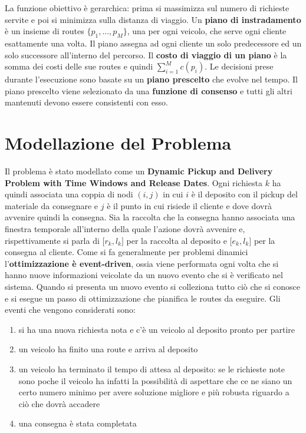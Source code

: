 \documentclass[
    article,            %
    12pt,                %
    oneside,            %
    a4paper,            %
    english,            %
    italian,                %
    sumario=tradicional,
]{abntex2}
\begin{document}
\newline
La funzione obiettivo è gerarchica: prima si massimizza sul numero di richieste servite e poi si minimizza sulla distanza di viaggio.
\newline
Un \textbf{piano di instradamento} è un insieme di routes $\{p_1,...,p_M\}$, una per ogni veicolo, che serve ogni cliente esattamente una volta. Il piano assegna ad ogni cliente un solo predecessore ed un solo successore all'interno del percorso.  Il \textbf{costo di viaggio di un piano} è la somma dei costi delle sue routes e quindi $\sum_{i=1}^M c(p_i)$. Le decisioni prese durante l'esecuzione sono basate su un \textbf{piano prescelto} che evolve nel tempo. Il piano prescelto viene selezionato da una \textbf{funzione di consenso} e tutti gli altri mantenuti devono essere consistenti con esso.

\hypertarget{modellazione-del-problema}{%
\section{Modellazione del Problema}\label{modellazione-del-problema}}

Il problema è stato modellato come un \textbf{Dynamic Pickup and Delivery Problem with Time Windows and Release Dates}. Ogni richiesta {\(k\)} ha quindi associata una coppia di nodi {\((i,j)\)} in cui {\(i\)} è il deposito con il pickup del materiale da consegnare e {\(j\)} è il punto in cui risiede il cliente e dove dovrà avvenire quindi la consegna. Sia la raccolta che la consegna hanno associata una finestra temporale all'interno della quale l'azione dovrà avvenire e, rispettivamente si parla di {\(\lbrack r_{k},l_{k}\rbrack\)} per la raccolta al deposito e {\(\lbrack e_{k},l_{k}\rbrack\)} per la consegna al cliente. Come si fa generalmente per problemi dinamici l'\textbf{ottimizzazione è event-driven}, ossia viene performata ogni volta che si hanno nuove informazioni veicolate da un nuovo evento che si è verificato nel sistema. Quando si presenta un nuovo evento si colleziona tutto ciò che si conosce e si esegue un passo di ottimizzazione che pianifica le routes da eseguire. Gli eventi che vengono considerati sono:

\begin{enumerate}
    \label{events}
    \item si ha una nuova richiesta nota e c'è un veicolo al deposito pronto per partire
    \item un veicolo ha finito una route e arriva al deposito
    \item un veicolo ha terminato il tempo di attesa al deposito: se le richieste note sono poche il veicolo ha infatti la possibilità di aspettare che ce ne siano un certo numero minimo per avere soluzione migliore e più robusta riguardo a ciò che dovrà accadere
    \item una consegna è stata completata 
\end{enumerate}
\end{document}
